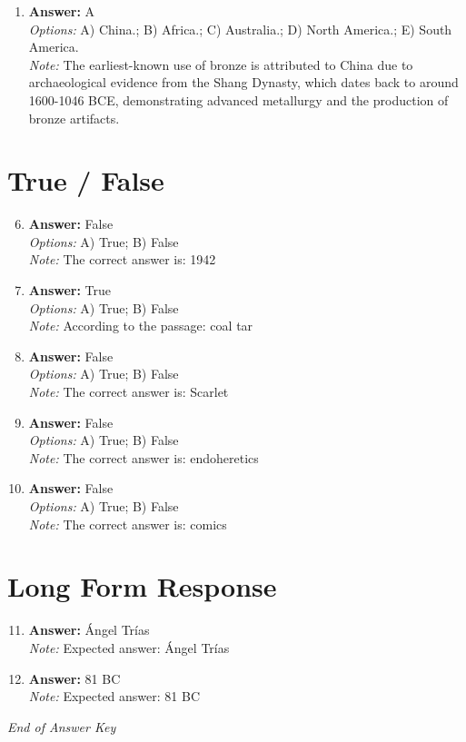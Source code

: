 \documentclass[12pt]{article}
\begin{document}
\begin{enumerate}[label=\arabic*.]
\\ \textit{Note:} The presence of parietal and mobiliary art during the Upper Paleolithic strongly indicates advances in human intellect as it reflects complex cognitive abilities, symbolic thinking, and the capacity for abstract representation, which are hallmarks of advanced cultural development.
\item \textbf{Answer:} A
\\ \textit{Options:} A) China.; B) Africa.; C) Australia.; D) North America.; E) South America.
\\ \textit{Note:} The earliest-known use of bronze is attributed to China due to archaeological evidence from the Shang Dynasty, which dates back to around 1600-1046 BCE, demonstrating advanced metallurgy and the production of bronze artifacts.
\end{enumerate}

\section*{True / False}
\begin{enumerate}[label=\arabic*.]
\setcounter{enumi}{5}
\item \textbf{Answer:} False
\\ \textit{Options:} A) True; B) False
\\ \textit{Note:} The correct answer is: 1942
\item \textbf{Answer:} True
\\ \textit{Options:} A) True; B) False
\\ \textit{Note:} According to the passage: coal tar
\item \textbf{Answer:} False
\\ \textit{Options:} A) True; B) False
\\ \textit{Note:} The correct answer is: Scarlet
\item \textbf{Answer:} False
\\ \textit{Options:} A) True; B) False
\\ \textit{Note:} The correct answer is: endoheretics
\item \textbf{Answer:} False
\\ \textit{Options:} A) True; B) False
\\ \textit{Note:} The correct answer is: comics
\end{enumerate}

\section*{Long Form Response}
\begin{enumerate}[label=\arabic*.]
\setcounter{enumi}{10}
\item \textbf{Answer:} Ángel Trías
\\ \textit{Note:} Expected answer: Ángel Trías
\item \textbf{Answer:} 81 BC
\\ \textit{Note:} Expected answer: 81 BC
\end{enumerate}

\vfill
\noindent\textit{End of Answer Key}
\end{document}
